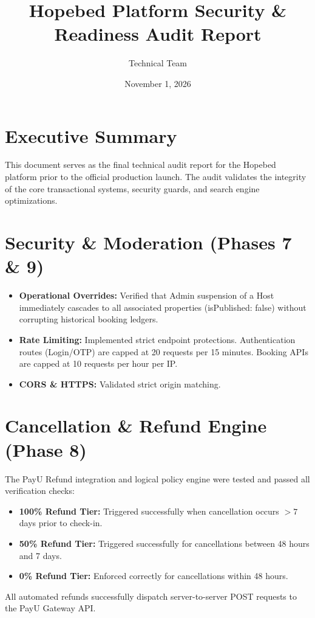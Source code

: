 \documentclass[12pt,a4paper]{article}
\title{\textbf{Hopebed Platform Security \& Readiness Audit Report}}
\author{Technical Team}
\date{November 1, 2026}
\begin{document}
\maketitle

\section*{Executive Summary}
This document serves as the final technical audit report for the Hopebed platform prior to the official production launch. The audit validates the integrity of the core transactional systems, security guards, and search engine optimizations.

\section{Security \& Moderation (Phases 7 \& 9)}
\begin{itemize}[label=\checkmark]
    \item \textbf{Operational Overrides:} Verified that Admin suspension of a Host immediately cascades to all associated properties (isPublished: false) without corrupting historical booking ledgers.
    \item \textbf{Rate Limiting:} Implemented strict endpoint protections. Authentication routes (Login/OTP) are capped at 20 requests per 15 minutes. Booking APIs are capped at 10 requests per hour per IP.
    \item \textbf{CORS \& HTTPS:} Validated strict origin matching.
\end{itemize}

\section{Cancellation \& Refund Engine (Phase 8)}
The PayU Refund integration and logical policy engine were tested and passed all verification checks:
\begin{itemize}[label=\checkmark]
    \item \textbf{100\% Refund Tier:} Triggered successfully when cancellation occurs $>7$ days prior to check-in.
    \item \textbf{50\% Refund Tier:} Triggered successfully for cancellations between 48 hours and 7 days.
    \item \textbf{0\% Refund Tier:} Enforced correctly for cancellations within 48 hours.
\end{itemize}
All automated refunds successfully dispatch server-to-server POST requests to the PayU Gateway API.
\end{document}
